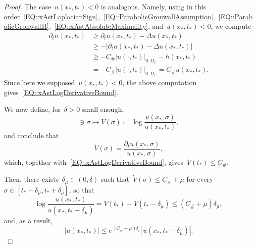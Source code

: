 \documentclass[12pt,a4paper]{amsart}
\numberwithin{equation}{section}
\theoremstyle{definition}
\theoremstyle{remark}
\newcommand{\abs}[1]{\left\lvert#1\right\rvert}
\renewcommand{\leq}{\leqslant}
\renewcommand{\geq}{\geqslant}
\begin{document}
\begin{proof}
    The case~$u(x_\ast,t_\ast) < 0$ is analogous. Namely, using in this order~\eqref{EQ::xAstLaplacianSign},~\eqref{EQ::ParabolicGronwallAssumption},~\eqref{EQ::ParabolicGronwallH},~\eqref{EQ::xAstAbsoluteMaximality}, and~$u(x_\ast,t_\ast) < 0$, we compute
    \begin{align}
        \partial_t u(x_\ast,t_\ast) &\geq \partial_t u(x_\ast,t_\ast) - \Delta u(x_\ast,t_\ast)\\
            &\geq -\abs{ \partial_t u(x_\ast,t_\ast) - \Delta u(x_\ast,t_\ast)}\\
            &\geq - C_\# \abs{u(\cdot, t_\ast)}_{0; \Omega_L} - h(x_\ast,t_\ast)\\
            &= - C_\#\abs{u(\cdot, t_\ast)}_{0; \Omega_L} = C_\# u(x_\ast,t_\ast).
    \end{align}
    Since here we supposed~$u(x_\ast,t_\ast)<0$, the above computation gives~\eqref{EQ::xAstLogDerivativeBound}.

    We now define, for~$\delta>0$ small enough,
    \begin{equation}
        [t_\ast-\delta, t_\ast+\delta] \ni \sigma \longmapsto V(\sigma) \coloneq \log \frac{u(x_\ast, \sigma)}{u(x_\ast, t_\ast)},
    \end{equation}
    and conclude that
    \begin{equation}
        \dot{V}(\sigma) = \frac{\partial_t u(x_\ast, \sigma)}{u(x_\ast, \sigma)},
    \end{equation}
    which, together with~\eqref{EQ::xAstLogDerivativeBound}, gives~$\dot{V}(t_\ast) \leq C_\#$.

    Then, there exists~$\delta_\mu \in (0,\delta)$ such that~$\dot{V}(\sigma) \leq C_\# + \mu$ for every~$\sigma \in [t_\ast-\delta_\mu, t_\ast+\delta_\mu]$, so that
    \begin{equation}
        \log \frac{u(x_\ast, t_\ast)}{u(x_\ast, t_\ast-\delta_\mu)} = V(t_\ast) - V(t_\ast-\delta_\mu) \leq \left(C_\# + \mu\right)\delta_\mu,
    \end{equation}
    and, as a result,
    \begin{equation}\label{EQ::xAstExponentialBound}
        \abs{u(x_\ast, t_\ast)} \leq e^{(C_\# + \mu)\delta_\mu}\abs{u(x_\ast, t_\ast-\delta_\mu)}.
    \end{equation}


\end{proof}
\end{document}
